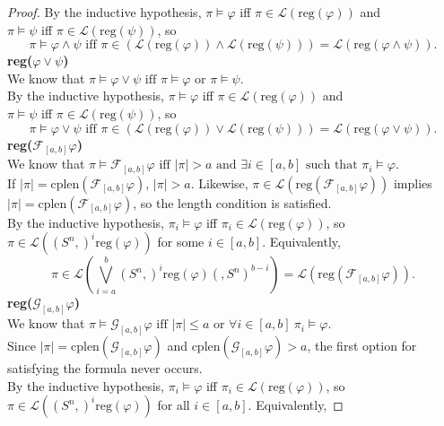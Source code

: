 \documentclass[runningheads]{llncs}
\renewcommand{\phi}{\varphi}
\begin{document}
\begin{proof}
 By the inductive hypothesis, $\pi \vDash \varphi$ iff $\pi \in \mathscr{L}(\text{reg}(\varphi))$ and 
 \\$\pi \vDash \psi$ iff $\pi \in \mathscr{L}(\text{reg}(\psi))$, so
 $$\pi \vDash \varphi \land \psi \text{ iff } \pi \in (\mathscr{L}(\text{reg}(\varphi)) \land \mathscr{L}(\text{reg}(\psi))) = \mathscr{L}(\text{reg}(\varphi \land \psi)).$$
 \noindent \textbf{reg($\varphi \lor \psi$)}\\
 We know that $\pi \vDash \varphi \lor \psi \text{ iff } \pi \vDash \varphi \text{ or } \pi \vDash \psi$.\\
 By the inductive hypothesis, $\pi \vDash \varphi$ iff $\pi \in \mathscr{L}(\text{reg}(\varphi))$ and 
 \\$\pi \vDash \psi$ iff $\pi \in \mathscr{L}(\text{reg}(\psi))$, so
 $$\pi \vDash \varphi \lor \psi \text{ iff } \pi \in (\mathscr{L}(\text{reg}(\varphi)) \lor \mathscr{L}(\text{reg}(\psi))) = \mathscr{L}(\text{reg}(\varphi \lor \psi)).$$
 \noindent \textbf{reg($\mathcal{F}_{[a,b]} \varphi$)}\\
 We know that $\pi \vDash \mathcal{F}_{[a,b]} \varphi \text{ iff } |\pi| > a \text{ and } \exists i \in [a,b] \text{ such that } \pi_i \vDash \varphi$.\\
 If $|\pi| = \text{cplen}(\mathcal{F}_{[a,b]} \varphi)$, $|\pi| > a$. Likewise, $\pi \in \mathscr{L}\left(\text{reg}\left(\mathcal{F}_{[a,b]} \varphi \right)\right)$ implies $|\pi| = \text{cplen}(\mathcal{F}_{[a,b]} \varphi)$, so the length condition is satisfied.\\
 By the inductive hypothesis, $\pi_i \vDash \varphi$ iff $\pi_i \in \mathscr{L}(\text{reg}(\varphi))$, so $\pi \in \mathscr{L}((S^n,)^i \text{reg}(\varphi))$ for some $i \in [a,b]$. Equivalently, 
 $$\pi \in \mathscr{L}\left(\bigvee_{i=a}^{b} (S^n,)^i \text{reg}(\phi)(,S^n)^{b-i}\right) = \mathscr{L}(\text{reg}(\mathcal{F}_{[a,b]}\varphi)).$$
 \noindent \textbf{reg($\mathcal{G}_{[a,b]} \varphi$)}\\
 We know that $\pi \vDash \mathcal{G}_{[a,b]}\varphi \text{ iff } |\pi| \leq a \text{ or } \forall i \in [a,b] \ \pi_i \vDash \varphi$.\\
 Since $|\pi| = \text{cplen}(\mathcal{G}_{[a,b]} \varphi)$ and $\text{cplen}(\mathcal{G}_{[a,b]} \varphi) > a$, the first option for satisfying the formula never occurs.\\
 By the inductive hypothesis, $\pi_i \vDash \varphi$ iff $\pi_i \in \mathscr{L}(\text{reg}(\varphi))$, so $\pi \in \mathscr{L}((S^n,)^i \text{reg}(\varphi))$ for all $i \in [a,b]$. Equivalently, 

\end{proof}
\end{document}
